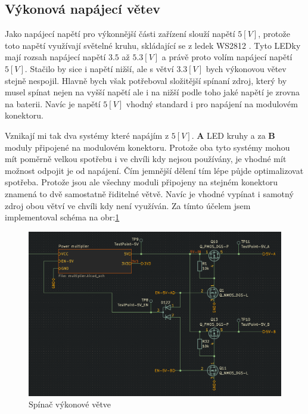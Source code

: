 \subsection{Výkonová napájecí větev}
Jako napájecí napětí pro výkonnější části zařízení slouží napětí \(5 [V]\), protože toto napětí využívají světelné kruhu, skládající se z ledek WS2812 \cite{WS2812B}.
Tyto LEDky mají rozsah napájecí napětí \(3.5\) až \(5.3 [V]\) a právě proto volím napájecí napětí \(5 [V]\).
Stačilo by sice i napětí nižší, ale s větví \(3.3 [V]\) bych výkonovou větev stejně nespojil.
Hlavně bych však potřeboval složitější spínaní zdroj, který by musel spínat nejen na vyšší napětí ale i na nižší podle toho jaké napětí je zrovna na baterii.
Navíc je napětí \(5 [V]\) vhodný standard i pro napájení na modulovém konektoru.

Vznikají mi tak dva systémy které napájím z \(5 [V]\).
{\bf A} LED kruhy a za {\bf B} moduly připojené na modulovém konektoru.
Protože oba tyto systémy mohou mít poměrně velkou spotřebu i ve chvíli kdy nejsou používány, je vhodné mít možnost odpojit je od napájení.
Čím jemnější dělení tím lépe půjde optimalizovat spotřeba.
Protože jsou ale všechny moduli připojeny na stejném konektoru znamená to dvě samostatně řiditelné větvě.
Navíc je vhodné vypínat i samotný zdroj obou větví ve chvíli kdy není využíván.
Za tímto účelem jsem implementoval schéma na obr:\ref{fig:spinac_vikonove_vetve}

\begin{figure}[h!]
    \centering
    \includegraphics[width=\textwidth]{text/PraktickaCast/img/spinac_vikonove_vetve.png}
    \caption{Spínač výkonové větve}
    \label{fig:spinac_vikonove_vetve}
\end{figure}

